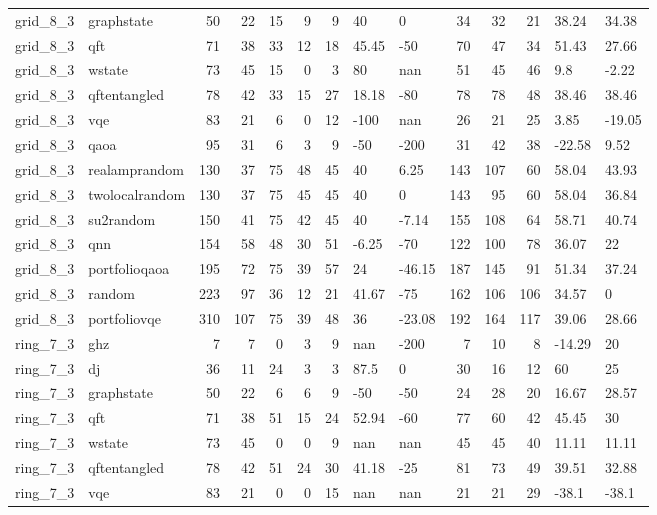 \begin{longtable}{llrrrrrllrrrll}
grid\_8\_3 & graphstate & 50 & 22 & 15 & 9 & 9 & 40 & 0 & 34 & 32 & 21 & 38.24 & 34.38 \\
grid\_8\_3 & qft & 71 & 38 & 33 & 12 & 18 & 45.45 & -50 & 70 & 47 & 34 & 51.43 & 27.66 \\
grid\_8\_3 & wstate & 73 & 45 & 15 & 0 & 3 & 80 & nan & 51 & 45 & 46 & 9.8 & -2.22 \\
grid\_8\_3 & qftentangled & 78 & 42 & 33 & 15 & 27 & 18.18 & -80 & 78 & 78 & 48 & 38.46 & 38.46 \\
grid\_8\_3 & vqe & 83 & 21 & 6 & 0 & 12 & -100 & nan & 26 & 21 & 25 & 3.85 & -19.05 \\
grid\_8\_3 & qaoa & 95 & 31 & 6 & 3 & 9 & -50 & -200 & 31 & 42 & 38 & -22.58 & 9.52 \\
grid\_8\_3 & realamprandom & 130 & 37 & 75 & 48 & 45 & 40 & 6.25 & 143 & 107 & 60 & 58.04 & 43.93 \\
grid\_8\_3 & twolocalrandom & 130 & 37 & 75 & 45 & 45 & 40 & 0 & 143 & 95 & 60 & 58.04 & 36.84 \\
grid\_8\_3 & su2random & 150 & 41 & 75 & 42 & 45 & 40 & -7.14 & 155 & 108 & 64 & 58.71 & 40.74 \\
grid\_8\_3 & qnn & 154 & 58 & 48 & 30 & 51 & -6.25 & -70 & 122 & 100 & 78 & 36.07 & 22 \\
grid\_8\_3 & portfolioqaoa & 195 & 72 & 75 & 39 & 57 & 24 & -46.15 & 187 & 145 & 91 & 51.34 & 37.24 \\
grid\_8\_3 & random & 223 & 97 & 36 & 12 & 21 & 41.67 & -75 & 162 & 106 & 106 & 34.57 & 0 \\
grid\_8\_3 & portfoliovqe & 310 & 107 & 75 & 39 & 48 & 36 & -23.08 & 192 & 164 & 117 & 39.06 & 28.66 \\
ring\_7\_3 & ghz & 7 & 7 & 0 & 3 & 9 & nan & -200 & 7 & 10 & 8 & -14.29 & 20 \\
ring\_7\_3 & dj & 36 & 11 & 24 & 3 & 3 & 87.5 & 0 & 30 & 16 & 12 & 60 & 25 \\
ring\_7\_3 & graphstate & 50 & 22 & 6 & 6 & 9 & -50 & -50 & 24 & 28 & 20 & 16.67 & 28.57 \\
ring\_7\_3 & qft & 71 & 38 & 51 & 15 & 24 & 52.94 & -60 & 77 & 60 & 42 & 45.45 & 30 \\
ring\_7\_3 & wstate & 73 & 45 & 0 & 0 & 9 & nan & nan & 45 & 45 & 40 & 11.11 & 11.11 \\
ring\_7\_3 & qftentangled & 78 & 42 & 51 & 24 & 30 & 41.18 & -25 & 81 & 73 & 49 & 39.51 & 32.88 \\
ring\_7\_3 & vqe & 83 & 21 & 0 & 0 & 15 & nan & nan & 21 & 21 & 29 & -38.1 & -38.1 \\

\end{longtable}
